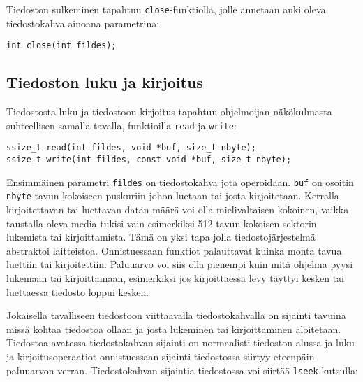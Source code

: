 Tiedoston sulkeminen tapahtuu \texttt{close}-funktiolla,
jolle annetaan auki oleva tiedostokahva ainoana parametrina:

\begin{verbatim}
int close(int fildes);
\end{verbatim}

\subsection{Tiedoston luku ja kirjoitus}

Tiedostosta luku ja tiedostoon kirjoitus tapahtuu ohjelmoijan näkökulmasta suhteellisen
samalla tavalla, funktioilla \texttt{read} ja \texttt{write}:

\begin{verbatim}
ssize_t read(int fildes, void *buf, size_t nbyte);
ssize_t write(int fildes, const void *buf, size_t nbyte);
\end{verbatim}

Ensimmäinen parametri \texttt{fildes} on tiedostokahva jota operoidaan.
\texttt{buf} on osoitin \texttt{nbyte} tavun kokoiseen puskuriin johon
luetaan tai josta kirjoitetaan.
Kerralla kirjoitettavan tai luettavan datan määrä voi olla mielivaltaisen kokoinen,
vaikka taustalla oleva media tukisi vain esimerkiksi 512 tavun kokoisen sektorin lukemista tai kirjoittamista.
Tämä on yksi tapa jolla tiedostojärjestelmä abstraktoi laitteistoa.
Onnistuessaan funktiot palauttavat kuinka monta tavua luettiin tai kirjoitettiin.
Paluuarvo voi siis olla pienempi kuin mitä ohjelma pyysi lukemaan tai kirjoittamaan,
esimerkiksi jos kirjoittaessa levy täyttyi kesken tai luettaessa
tiedosto loppui kesken.

Jokaisella tavalliseen tiedostoon viittaavalla tiedostokahvalla on sijainti tavuina missä kohtaa tiedostoa ollaan ja josta lukeminen tai kirjoittaminen aloitetaan.
Tiedostoa avatessa tiedostokahvan sijainti on normaalisti tiedoston alussa ja luku- ja kirjoitusoperaatiot onnistuessaan sijainti tiedostossa siirtyy eteenpäin paluuarvon verran.
Tiedostokahvan sijaintia tiedostossa voi siirtää \texttt{lseek}-kutsulla:

